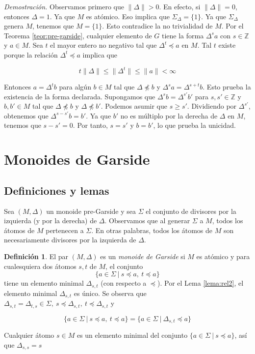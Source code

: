 \documentclass[12pt]{article}
\theoremstyle{definition}
\newtheorem{defi}{Definición}[section]
\providecommand{\norm}[1]{\lVert#1\rVert}
\begin{document}
\textit{Demostración.} Observamos primero que $\norm{\Delta}>0$. En efecto, si $\norm{\Delta}= 0$, entonces $\Delta=1$. Ya que $M$ es atómico. Eso implica que $\Sigma_\Delta=\{1\}$. Ya que $\Sigma_\Delta$ genera $M$, tenemos que $M=\{1\}$. Esto contradice la no trivialidad de $M$.
\newline
\newline
Por el Teorema \ref{teor:pre-garside}, cualquier elemento de $G$ tiene la forma $\Delta^sa$ con $s\in\mathbb{Z}$ y $a\in M$. Sea $t$ el mayor entero no negativo tal que $\Delta^t\preceq a$ en $M$. Tal $t$ existe porque la relación $\Delta^t\preceq a$ implica que

$$t\norm{\Delta}\leq \norm{\Delta^t}\leq \norm{a}<\infty$$

Entonces $a=\Delta^t b$ para algún $b\in M$ tal que $\Delta\npreceq b$ y $\Delta^s a=\Delta^{s+t} b$. Esto prueba la existencia de la forma declarada.
\newline
\newline
Supongamos que $\Delta^s b=\Delta^{s'}b'$ para $s,s'\in\mathbb{Z}$ y $b,b'\in M$ tal que $\Delta\npreceq b$ y $\Delta\npreceq b'$. Podemos asumir que $s\geq s'$. Dividiendo por $\Delta^{s'}$, obtenemos que $\Delta^{s-s'}b=b'$. Ya que $b'$ no es múltiplo por la derecha de $\Delta$ en $M$, tenemos que $s-s'=0$. Por tanto, $s=s'$ y $b=b'$, lo que prueba la unicidad.

\section{Monoides de Garside}
\subsection{Definiciones y lemas}

Sea $(M,\Delta)$ un monoide pre-Garside y sea $\Sigma$ el conjunto de divisores por la izquierda (y por la derecha) de $\Delta$. Observamos que al generar $\Sigma$ a $M$, todos los átomos de $M$ pertenecen a $\Sigma$. En otras palabras, todos los átomos de $M$ son necesariamente divisores por la izquierda de $\Delta$.

\begin{defi}
El par $(M,\Delta)$ es un \textit{monoide de Garside} si $M$ es atómico y para cualesquiera dos átomos $s,t$ de $M$, el conjunto
$$\{a\in\Sigma\ |\ s\preceq a,\ t\preceq a \}$$
\newline
tiene un elemento minimal $\Delta_{s,t}$ (con respecto a $\preceq$).
\newline
\newline
Por el Lema \ref{lema:rel2}, el elemento minimal $\Delta_{s,t}$ es único. Se observa que $\Delta_{s,t}=\Delta_{t,s}\in\Sigma,\ s\preceq\Delta_{s,t},\ t\preceq\Delta_{s,t}$ y 

$$\{a\in\Sigma\ |\ s\preceq a,\ t\preceq a \}=\{a\in\Sigma\ |\ \Delta_{s,t}\preceq a\}$$

Cualquier átomo $s\in M$ es un elemento minimal del conjunto $\{a\in\Sigma\ |\ s\preceq a\}$, así que $\Delta_{s,s}=s$
\label{defi:garside}
\end{defi}
\end{document}
